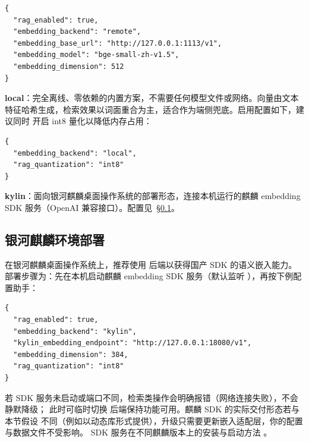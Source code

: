 \begin{lstlisting}[language={}]
{
  "rag_enabled": true,
  "embedding_backend": "remote",
  "embedding_base_url": "http://127.0.0.1:1113/v1",
  "embedding_model": "bge-small-zh-v1.5",
  "embedding_dimension": 512
}
\end{lstlisting}

\textbf{local}：完全离线、零依赖的内置方案，不需要任何模型文件或网络。向量由文本
特征哈希生成，检索效果以词面重合为主，适合作为端侧兜底。启用配置如下，建议同时
开启 int8 量化以降低内存占用：

\begin{lstlisting}[language={}]
{
  "embedding_backend": "local",
  "rag_quantization": "int8"
}
\end{lstlisting}

\textbf{kylin}：面向银河麒麟桌面操作系统的部署形态，连接本机运行的麒麟 embedding
SDK 服务（OpenAI 兼容接口）。配置见~\S\ref{sec:kylin-deploy}。

\subsection{银河麒麟环境部署}\label{sec:kylin-deploy}

在银河麒麟桌面操作系统上，推荐使用  后端以获得国产 SDK 的语义嵌入能力。
部署步骤为：先在本机启动麒麟 embedding SDK 服务（默认监听
），再按下例配置助手：

\begin{lstlisting}[language={}]
{
  "rag_enabled": true,
  "embedding_backend": "kylin",
  "kylin_embedding_endpoint": "http://127.0.0.1:18080/v1",
  "embedding_dimension": 384,
  "rag_quantization": "int8"
}
\end{lstlisting}

若 SDK 服务未启动或端口不同，检索类操作会明确报错（网络连接失败），不会静默降级；
此时可临时切换  后端保持功能可用。麒麟 SDK 的实际交付形态若与本节假设
不同（例如以动态库形式提供），升级只需要更新嵌入适配层，你的配置与数据文件不受影响。
SDK 服务在不同麒麟版本上的安装与启动方法 。
